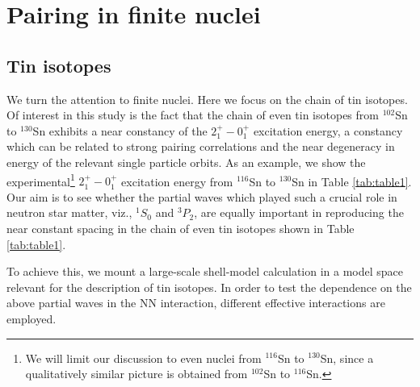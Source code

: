 \section{Pairing in finite nuclei} \label{sec:sec3}

\subsection{Tin isotopes}
We turn the attention to finite nuclei. Here we focus on the chain of 
tin isotopes. 
Of interest in this study is the fact that 
the chain of even tin isotopes from $^{102}$Sn to $^{130}$Sn 
exhibits a near constancy of the 
$2^+_1-0^+_1$ excitation energy, a constancy which can be related
to strong pairing correlations and the near degeneracy in energy 
of the relevant single particle orbits. As an example, we show the 
experimental\footnote{We will limit our discussion to even nuclei
from  $^{116}$Sn to $^{130}$Sn, since a qualitatively similar picture
is obtained from $^{102}$Sn to $^{116}$Sn.}
$2^+_1-0^+_1$ excitation energy 
from  $^{116}$Sn to $^{130}$Sn in Table \ref{tab:table1}. 
Our aim is to see whether the partial waves which played such a crucial
role in neutron star matter, viz., $^1S_0$ and $^3P_2$, are equally
important in reproducing the near constant spacing in the chain
of even tin isotopes shown in  Table \ref{tab:table1}. 

To achieve this, we mount a large-scale shell-model calculation in 
a model space relevant for the description of tin isotopes. 
In order to test the dependence on the above partial waves in
the NN interaction, different effective interactions are employed.
 
